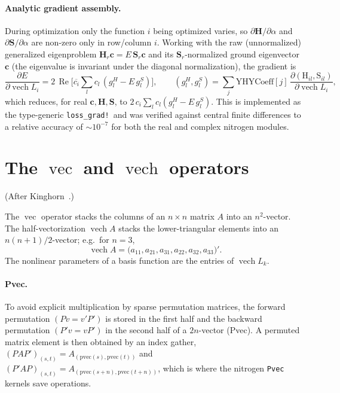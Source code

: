 \documentclass[11pt]{article}
\newcommand{\vech}{\operatorname{vech}}
\newcommand{\vecop}{\operatorname{vec}}
\begin{document}
\paragraph{Analytic gradient assembly.}
During optimization only the function $i$ being optimized varies, so
$\partial\mathbf{H}/\partial\alpha$ and $\partial\mathbf{S}/\partial\alpha$ are
non-zero only in row/column $i$. Working with the raw (unnormalized)
generalized eigenproblem $\mathbf{H}_r\mathbf{c}=E\,\mathbf{S}_r\mathbf{c}$ and
its $\mathbf{S}_r$-normalized ground eigenvector $\mathbf{c}$ (the eigenvalue is
invariant under the diagonal normalization), the gradient is
\begin{equation}
\frac{\partial E}{\partial \vech L_i}
=2\,\operatorname{Re}\!\Big[\overline{c_i}\sum_l c_l\,(g^H_l-E\,g^S_l)\Big],
\qquad
(g^H_l,g^S_l)=\sum_j \mathrm{YHYCoeff}[j]\,
\frac{\partial(\mathrm{H}_{il},\mathrm{S}_{il})}{\partial \vech L_i},
\end{equation}
which reduces, for real $\mathbf{c},\mathbf{H},\mathbf{S}$, to
$2\,c_i\sum_l c_l(g^H_l-E\,g^S_l)$. This is implemented as the type-generic
\texttt{loss\_grad!}\ and was verified against central finite differences to a
relative accuracy of $\sim10^{-7}$ for both the real and complex nitrogen
modules.

\section{The \texorpdfstring{$\vecop$}{vec} and \texorpdfstring{$\vech$}{vech} operators}
\label{app:vec}
(After Kinghorn~\cite{Kinghorn1996}.)

The $\vecop$ operator stacks the columns of an $n\times n$ matrix $A$ into an
$n^2$-vector. The half-vectorization $\vech A$ stacks the lower-triangular
elements into an $n(n+1)/2$-vector; e.g.\ for $n=3$,
\begin{equation}
\vech A=\big(a_{11},a_{21},a_{31},a_{22},a_{32},a_{33}\big)'.
\end{equation}
The nonlinear parameters of a basis function are the entries of $\vech L_k$.

\paragraph{Pvec.}
To avoid explicit multiplication by sparse permutation matrices, the
forward permutation $(Pv=v'P')$ is stored in the first half and the backward
permutation $(P'v=vP')$ in the second half of a $2n$-vector (Pvec). A permuted
matrix element is then obtained by an index gather,
$ (PAP')_{(s,t)}=A_{(\mathrm{pvec}(s),\mathrm{pvec}(t))}$ and
$ (P'AP)_{(s,t)}=A_{(\mathrm{pvec}(s+n),\mathrm{pvec}(t+n))}$,
which is where the nitrogen \texttt{Pvec} kernels save operations.
\end{document}
